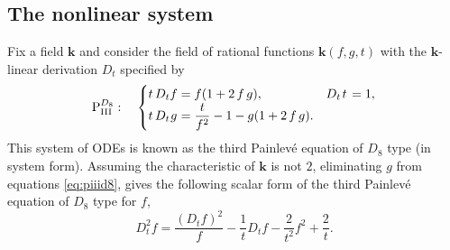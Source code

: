 \documentclass[a4paper,reqno]{amsart}
\numberwithin{equation}{section}
\numberwithin{figure}{section}
\theoremstyle{remark}
\newcommand\Pthree{\textrm{P}_{\textrm{III}}}
\begin{document}
\subsection{The nonlinear system}
Fix a field $\mathbf{k}$ and consider the field of rational functions $\mathbf{k}(f,g,t)$ with the $\mathbf{k}$-linear derivation $D_t$ specified by
 \begin{equation}\label{eq:piiid8}
 \Pthree^{D_8}:\quad           \begin{cases}
       t\, D_t f=f(1+2\,f\,g), &   D_t \hspace{0.4mm}t\hspace{0.4mm}=1, \\
  \displaystyle t\, D_t \hspace{0.2mm}g\hspace{0.1mm}=\frac{t}{f^2}-1-g(1+2\,f\,g). &   
    \end{cases}
    \end{equation}
This system of ODEs is known as the third Painlev\'e equation of $D_8$ type (in system form). Assuming the characteristic of $\mathbf{k}$ is not $2$, eliminating $g$ from equations \eqref{eq:piiid8}, gives the following scalar form of the third Painlev\'e equation of $D_8$ type for $f$,
\begin{equation*}
    D_t^2f=\frac{(D_tf)^2}{f}-\frac{1}{t}D_tf-\frac{2}{t^2}f^2+\frac{2}{t}.
\end{equation*}
\end{document}
